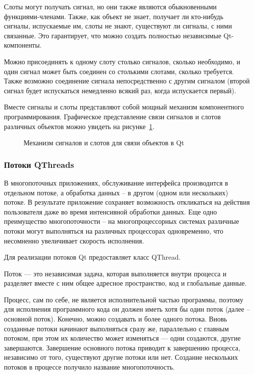 Слоты могут получать сигнал, но они также являются обыкновенными функциями-членами. Также, как объект не знает, получает ли кто-нибудь сигналы, испускаемые им, слоты не знают, существуют ли сигналы, с ними связанные. Это гарантирует, что можно создать полностью независимые Qt-компоненты.

Можно присоединять к одному слоту столько сигналов, сколько необходимо, и один сигнал может быть соединен со столькими слотами, сколько требуется. Также возможно соединение сигнала непосредственно с другим сигналом (второй сигнал будет испускаться немедленно всякий раз, когда испускается первый).

Вместе сигналы и слоты представляют собой мощный механизм компонентного программирования. Графическое представление связи сигналов и слотов различных объектов можно увидеть на рисунке~\ref{signals-slots:signals-slots}. \cite{signalsandslots}

\begin{figure}[h!]
\caption{ Механизм сигналов и слотов для связи объектов в Qt }
\label{signals-slots:signals-slots}
\end{figure}

\subsubsection{ Потоки QThreads }

В многопоточных приложениях, обслуживание интерфейса производится в отдельном потоке, а обработка данных -- в другом (одном или нескольких) потоке. В результате приложение сохраняет возможность откликаться на действия пользователя даже во время интенсивной обработки данных. Еще одно преимущество многопоточности -- на многопроцессорных системах различные потоки могут выполняться на различных процессорах одновременно, что несомненно увеличивает скорость исполнения.

Для реализации потоков Qt предоставляет класс QThread.

Поток — это независимая задача, которая выполняется внутри процесса и разделяет вместе с ним общее адресное пространство, код и глобальные данные.

Процесс, сам по себе, не является исполнительной частью программы, поэтому для исполнения программного кода он должен иметь хотя бы один поток (далее -- основной поток). Конечно, можно создавать и более одного потока. Вновь созданные потоки начинают выполняться сразу же, параллельно с главным потоком, при этом их количество может изменяться — одни создаются, другие завершаются. Завершение основного потока приводит к завершению процесса, независимо от того, существуют другие потоки или нет. Создание нескольких потоков в процессе получило название многопоточность. \cite{threadsandprocesses}

